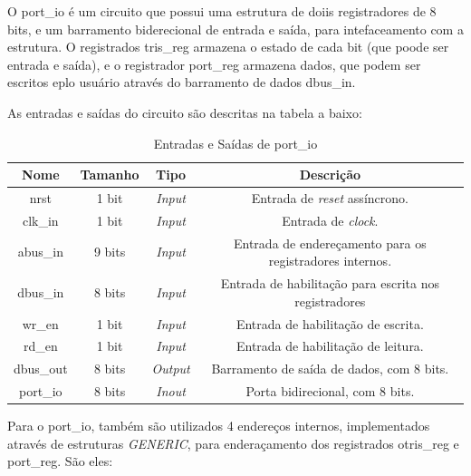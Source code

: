 \documentclass{article}
\begin{document}
O port\_io  é um circuito que possui uma estrutura de doiis registradores de 8 bits, e um barramento biderecional de entrada e saída, para intefaceamento com a estrutura. O registrados tris\_reg armazena o estado de cada bit (que poode ser entrada e saída), e o registrador port\_reg armazena dados, que podem ser escritos eplo usuário através do barramento de dados dbus\_in.

As entradas e saídas do circuito são descritas na tabela a baixo:\\

\begin{table}[ht]
    \begin{center}
        \begin{tabular}{|c|c|c|c|}
            \hline
            Nome & Tamanho & Tipo & Descrição\\
            \hline
            nrst & 1 bit & \textit{Input} & Entrada de \textit{reset} assíncrono.\\
            \hline
            clk\_in & 1 bit & \textit{Input} & Entrada de \textit{clock}.\\
            \hline
            abus\_in & 9 bits & \textit{Input} & Entrada de endereçamento para os registradores internos.\\
            \hline
            dbus\_in & 8 bits & \textit{Input} & Entrada de habilitação para escrita nos registradores\\
            \hline
            wr\_en & 1 bit & \textit{Input} & Entrada de habilitação de escrita.\\
            \hline
            rd\_en & 1 bit & \textit{Input} & Entrada de habilitação de leitura.\\
            \hline
            dbus\_out & 8 bits & \textit{Output} & Barramento de saída de dados, com 8 bits.\\
            \hline
            port\_io & 8 bits & \textit{Inout} & Porta bidirecional, com 8 bits.\\
            \hline
        \end{tabular}
    \end{center}
    \caption{Entradas e Saídas de port\_io}
\end{table}

Para o port\_io, também são utilizados 4 endereços internos, implementados através de estruturas \textit{GENERIC}, para enderaçamento dos registrados otris\_reg e port\_reg. São eles:
\end{document}
